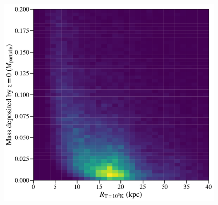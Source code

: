 \documentclass[fleqn,usenatbib]{mnras}
\newcommand{\Rcon}{R_{T=10^5\,{\rm K}}}
\begin{document}
\begin{figure}
\includegraphics[width=\columnwidth]{figures/mass_dep_vs_R1e5.pdf}
\label{f: deposited mass vs R1e5}
\end{figure}





\bsp	%
\label{lastpage}
\end{document}
